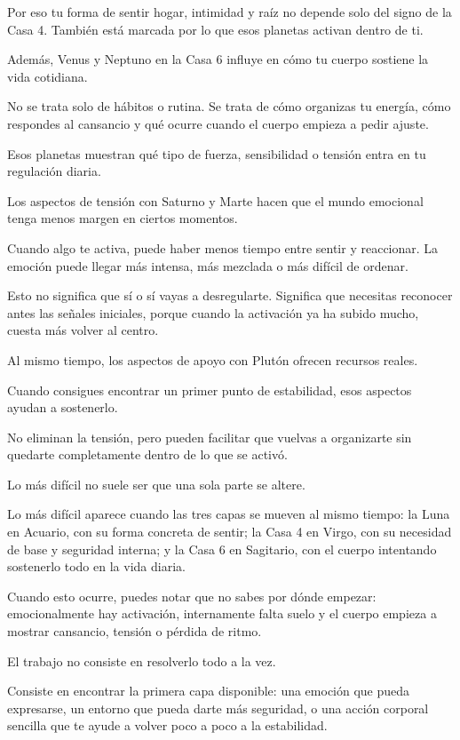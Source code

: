 \documentclass[11pt,a4paper]{article}
\begin{document}
Por eso tu forma de sentir hogar, intimidad y raíz no depende solo del signo de la Casa 4. También está marcada por lo que esos planetas activan dentro de ti.

Además, Venus y Neptuno en la Casa 6 influye en cómo tu cuerpo sostiene la vida cotidiana.

No se trata solo de hábitos o rutina. Se trata de cómo organizas tu energía, cómo respondes al cansancio y qué ocurre cuando el cuerpo empieza a pedir ajuste.

Esos planetas muestran qué tipo de fuerza, sensibilidad o tensión entra en tu regulación diaria.

Los aspectos de tensión con Saturno y Marte hacen que el mundo emocional tenga menos margen en ciertos momentos.

Cuando algo te activa, puede haber menos tiempo entre sentir y reaccionar. La emoción puede llegar más intensa, más mezclada o más difícil de ordenar.

Esto no significa que sí o sí vayas a desregularte. Significa que necesitas reconocer antes las señales iniciales, porque cuando la activación ya ha subido mucho, cuesta más volver al centro.

Al mismo tiempo, los aspectos de apoyo con Plutón ofrecen recursos reales.

Cuando consigues encontrar un primer punto de estabilidad, esos aspectos ayudan a sostenerlo.

No eliminan la tensión, pero pueden facilitar que vuelvas a organizarte sin quedarte completamente dentro de lo que se activó.

Lo más difícil no suele ser que una sola parte se altere.

Lo más difícil aparece cuando las tres capas se mueven al mismo tiempo:
la Luna en Acuario, con su forma concreta de sentir;
la Casa 4 en Virgo, con su necesidad de base y seguridad interna;
y la Casa 6 en Sagitario, con el cuerpo intentando sostenerlo todo en la vida diaria.

Cuando esto ocurre, puedes notar que no sabes por dónde empezar: emocionalmente hay activación, internamente falta suelo y el cuerpo empieza a mostrar cansancio, tensión o pérdida de ritmo.

El trabajo no consiste en resolverlo todo a la vez.

Consiste en encontrar la primera capa disponible: una emoción que pueda expresarse, un entorno que pueda darte más seguridad, o una acción corporal sencilla que te ayude a volver poco a poco a la estabilidad.
\end{document}
